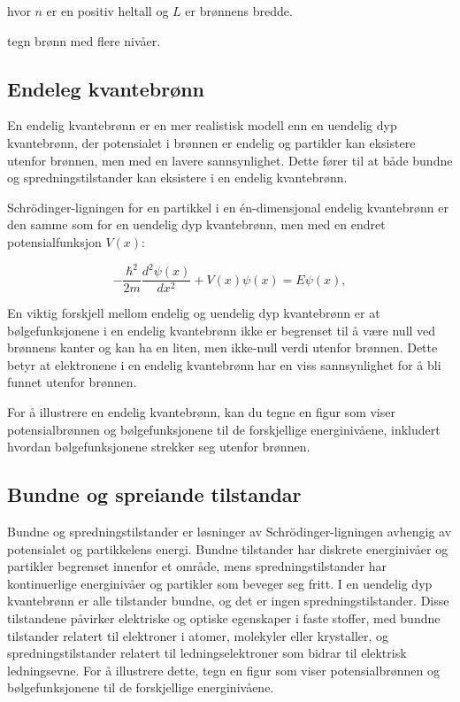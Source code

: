 hvor $n$ er en positiv heltall og $L$ er brønnens bredde.

tegn brønn med flere nivåer.

\subsection*{Endeleg kvantebrønn}
En endelig kvantebrønn er en mer realistisk modell enn en uendelig dyp kvantebrønn, der potensialet i brønnen er endelig og partikler kan eksistere utenfor brønnen, men med en lavere sannsynlighet. Dette fører til at både bundne og spredningstilstander kan eksistere i en endelig kvantebrønn.

Schrödinger-ligningen for en partikkel i en én-dimensjonal endelig kvantebrønn er den samme som for en uendelig dyp kvantebrønn, men med en endret potensialfunksjon $V(x)$:

\begin{equation*}
-\frac{\hbar^2}{2m}\frac{d^2\psi(x)}{dx^2} + V(x)\psi(x) = E\psi(x),
\end{equation*}

En viktig forskjell mellom endelig og uendelig dyp kvantebrønn er at bølgefunksjonene i en endelig kvantebrønn ikke er begrenset til å være null ved brønnens kanter og kan ha en liten, men ikke-null verdi utenfor brønnen. Dette betyr at elektronene i en endelig kvantebrønn har en viss sannsynlighet for å bli funnet utenfor brønnen.

For å illustrere en endelig kvantebrønn, kan du tegne en figur som viser potensialbrønnen og bølgefunksjonene til de forskjellige energinivåene, inkludert hvordan bølgefunksjonene strekker seg utenfor brønnen.

\subsection*{Bundne og spreiande tilstandar}
Bundne og spredningstilstander er løsninger av Schrödinger-ligningen avhengig av potensialet og partikkelens energi. Bundne tilstander har diskrete energinivåer og partikler begrenset innenfor et område, mens spredningstilstander har kontinuerlige energinivåer og partikler som beveger seg fritt. I en uendelig dyp kvantebrønn er alle tilstander bundne, og det er ingen spredningstilstander. Disse tilstandene påvirker elektriske og optiske egenskaper i faste stoffer, med bundne tilstander relatert til elektroner i atomer, molekyler eller krystaller, og spredningstilstander relatert til ledningselektroner som bidrar til elektrisk ledningsevne. For å illustrere dette, tegn en figur som viser potensialbrønnen og bølgefunksjonene til de forskjellige energinivåene.

